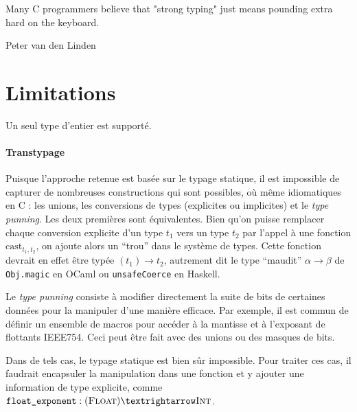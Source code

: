 \epigraph{
Many C programmers
believe that "strong typing" just means pounding extra hard on the keyboard.
}{Peter van den Linden}



\section{Limitations}

Un seul type d'entier est supporté.



\paragraph{Transtypage}

Puisque l'approche retenue est basée sur le typage statique, il est impossible
de capturer de nombreuses constructions qui sont possibles, où même idiomatiques
en C : les unions, les conversions de types (explicites ou implicites) et le
\emph{type punning}. Les deux premières sont équivalentes. Bien qu'on puisse
remplacer chaque conversion explicite d'un type $t_1$ vers un type $t_2$ par
l'appel à une fonction $\mathrm{cast}_{t_1,t_2}$, on ajoute alors un ``trou''
dans le système de types. Cette fonction devrait en effet être typée $(t_1) →
t_2$, autrement dit le type ``maudit'' $α → β$ de \texttt{Obj.magic} en OCaml ou
\texttt{unsafeCoerce} en Haskell.


Le \emph{type punning} consiste à modifier directement la suite de bits de
certaines données pour la manipuler d'une manière efficace. Par exemple, il est
commun de définir un ensemble de macros pour accéder à la mantisse et à
l'exposant de flottants IEEE754. Ceci peut être fait avec des unions ou des
masques de bits.

Dans de tels cas, le typage statique est bien sûr impossible. Pour traiter ces
cas, il faudrait encapsuler la manipulation dans une fonction et y ajouter une
information de type explicite, comme $\texttt{float\_exponent} : (\tFloat) →
\tInt$.

